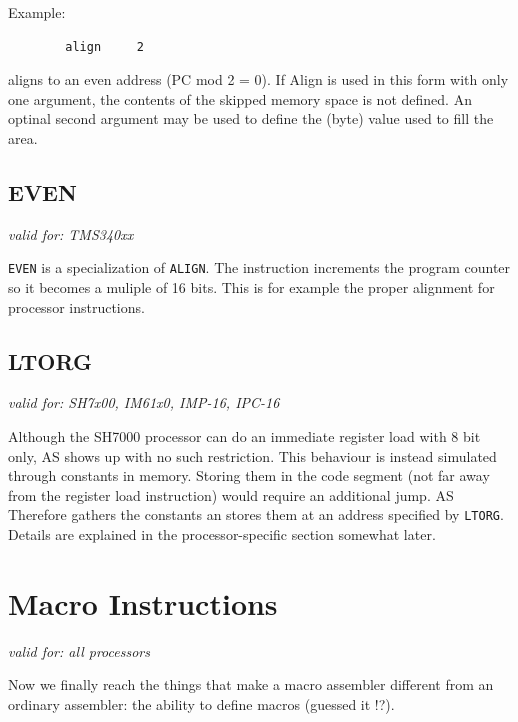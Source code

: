 \documentclass[12pt,twoside]{report}
\makeatletter
\newcommand{\tty}[1]{{\tt #1}}
\newcommand{\ttindex}[1]{\index{#1@{\tt #1}}}
\newcommand{\asname}{{AS}}
\makeatother
\begin{document}
Example:
\begin{verbatim}
        align     2
\end{verbatim}
aligns to an even address (PC mod 2 = 0).  If Align is used in this form with
only one argument, the contents of the skipped memory space is not defined. 
An optinal second argument may be used to define the (byte) value
used to fill the area.

 
\subsection{EVEN}
\ttindex{EVEN}
 
{\em valid for: TMS340xx}

\tty{EVEN} is a specialization of \tty{ALIGN}. The instruction increments the
program counter so it becomes a muliple of 16 bits.  This is for example the
proper alignment for processor instructions.
 

\subsection{LTORG}
\ttindex{LTORG}

{\em valid for: SH7x00, IM61x0, IMP-16, IPC-16}

Although the SH7000 processor can do an immediate register load with
8 bit only, \asname{} shows up with no such restriction.  This behaviour is
instead simulated through constants in memory.  Storing them in
the code segment (not far away from the register load instruction)
would require an additional jump.  \asname{} Therefore gathers the constants
an stores them at an address specified by \tty{LTORG}.  Details are
explained in the processor-specific section somewhat later.


\section{Macro Instructions}

{\em valid for: all processors}

Now we finally reach the things that make a macro assembler different
from an ordinary assembler: the ability to define macros (guessed
it !?).
\end{document}
